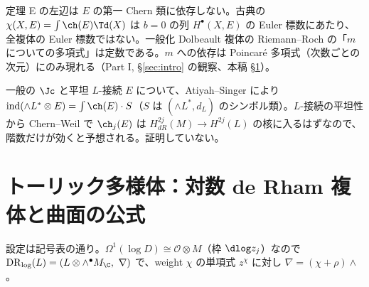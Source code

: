 \begin{rem}[意味\ \tP]
定理 E の左辺は $E$ の第一 Chern 類に依存しない。古典の $\chi(X,E)=\int\ch(E)\Td(X)$ は $b=0$ の列 $H^\bullet(X,E)$ の Euler 標数にあたり、全複体の Euler 標数ではない。一般化 Dolbeault 複体の Riemann--Roch の「$m$ についての多項式」は定数である。$m$ への依存は Poincaré 多項式（次数ごとの次元）にのみ現れる（Part I, \S\ref{sec:intro} の観察、本稿 \S\ref{sec:toric}）。
\end{rem}
\begin{rem}[一般の一般化複素構造\ \tK]
一般の $\Jc$ と平坦 $L$-接続 $E$ について、Atiyah--Singer により $\mathrm{ind}(\wedge L^*\otimes E)=\int\ch(E)\cdot S$（$S$ は $(\wedge L^*,d_L)$ のシンボル類）。$L$-接続の平坦性から Chern--Weil で $\ch_j(E)$ は $H^{2j}_{dR}(M)\to H^{2j}(L)$ の核に入るはずなので、階数だけが効くと予想される。証明していない。
\end{rem}

\section{トーリック多様体：対数 de Rham 複体と曲面の公式}\label{sec:toric}
設定は記号表の通り。$\Omega^1(\log D)\cong\mathcal O\otimes M$（枠 $\dlog z_j$）なので $\mathrm{DR}_{\log}(L)=(L\otimes\wedge^\bullet M_\C,\ \nabla)$ で、weight $\chi$ の単項式 $z^\chi$ に対し $\nabla=(\chi+\rho)\wedge$。

